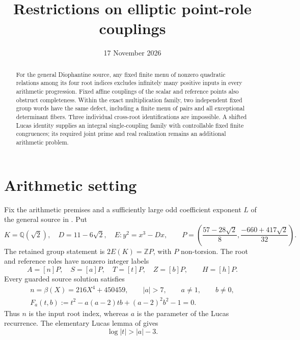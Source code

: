 \documentclass[11pt,a4paper]{article}
\title{Restrictions on elliptic point-role couplings}
\author{}\date{17 November 2026}
\newcommand{\Q}{\mathbb Q}\newcommand{\Z}{\mathbb Z}
\begin{document}
\maketitle
\begin{abstract}
For the general Diophantine source, any fixed finite menu of nonzero
quadratic relations among its four root indices excludes infinitely
many positive inputs in every arithmetic progression. Fixed affine
couplings of the scalar and reference points also obstruct
completeness. Within the exact multiplication family, two independent
fixed group words have the same defect, including a finite menu of
pairs and all exceptional determinant fibers. Three individual
cross-root identifications are impossible. A shifted Lucas identity
supplies an integral single-coupling family with controllable fixed
finite congruences; its required joint prime and real realization
remains an additional arithmetic problem.
\end{abstract}

\section{Arithmetic setting}

Fix the arithmetic premises and a sufficiently large odd coefficient
exponent $L$ of the general source in \cite{General,Unit}. Put
\[
 K=\Q(\sqrt2),\quad D=11-6\sqrt2,\quad E:y^2=x^3-Dx,
 \qquad
 P=\left(\frac{57-28\sqrt2}{8},
          \frac{-660+417\sqrt2}{32}\right).
\]
The retained group statement is $2E(K)=\Z P$, with $P$ non-torsion.
The root and reference roles have nonzero integer labels
\[
 A=[n]P,\quad S=[a]P,\quad T=[t]P,\quad Z=[b]P,
 \qquad H=[h]P.
\]
Every guarded source solution satisfies
\begin{equation}\label{eq:source}
 \begin{gathered}
 n=\beta(X)=216X^4+450459,\qquad |a|>7,\qquad a\ne1,\qquad b\ne0,\\
 F_a(t,b):=t^2-a(a-2)tb+(a-2)^2b^2-1=0.
 \end{gathered}
\end{equation}
Thus $n$ is the input root index, whereas $a$ is the parameter of
the Lucas recurrence. The elementary Lucas lemma of \cite{Lucas}
gives
\begin{equation}\label{eq:growth}
                         \log|t|>|a|-3.
\end{equation}
\end{document}

